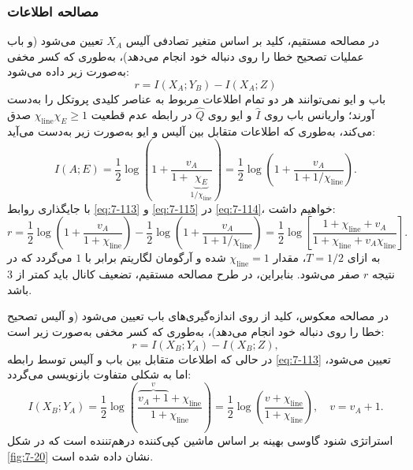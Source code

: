 \subsubsection{مصالحه اطلاعات}
\label{subsec:7-6-3}
در مصالحه مستقیم، کلید بر اساس متغیر تصادفی آلیس $X_A$ تعیین می‌شود (و باب عملیات تصحیح خطا را روی دنباله خود انجام می‌دهد)، به‌طوری که کسر مخفی به‌صورت زیر داده می‌شود:
\begin{equation}
	r = I(X_A; Y_B) - I(X_A; Z)
	\label{eq:7-114}
\end{equation}
باب و ایو نمی‌توانند هر دو تمام اطلاعات مربوط به عناصر کلیدی پروتکل را به‌دست آورند؛ واریانس باب روی $\hat{I}$ و ایو روی $\hat{Q}$ در رابطه عدم قطعیت $\chi_{\text{line}}\chi_E \geq 1$ صدق می‌کند، به‌طوری که اطلاعات متقابل بین آلیس و ایو به‌صورت زیر به‌دست می‌آید:
\begin{equation}
	I(A; E) = \frac{1}{2} \log \left( 1 + \frac{v_A}{1 + \underbrace{\chi_E}_{1/\chi_{\text{line}}}} \right) = \frac{1}{2} \log \left( 1 + \frac{v_A}{1 + 1/\chi_{\text{line}}} \right).
	\label{eq:7-115}
\end{equation}
با جایگذاری روابط \eqref{eq:7-113} و \eqref{eq:7-115} در \eqref{eq:7-114}، خواهیم داشت:
\begin{equation}
	r = \frac{1}{2} \log \left( 1 + \frac{v_A}{1 + \chi_{\text{line}}} \right) - \frac{1}{2} \log \left( 1 + \frac{v_A}{1 + 1/\chi_{\text{line}}} \right) = \frac{1}{2} \log \left[ \frac{1 + \chi_{\text{line}} + v_A}{1 + \chi_{\text{line}} + v_A \chi_{\text{line}}} \right].
	\label{eq:7-116}
\end{equation}
به ازای $T = 1/2$، مقدار $\chi_{\text{line}} = 1$ شده و آرگومان لگاریتم برابر با $1$ می‌گردد که در نتیجه $r$ صفر می‌شود. بنابراین، در طرح مصالحه مستقیم، تضعیف کانال باید کمتر از $3$  باشد.

در مصالحه معکوس، کلید از روی اندازه‌گیری‌های باب تعیین می‌شود (و آلیس تصحیح خطا را روی دنباله خود انجام می‌دهد)، به‌طوری که کسر مخفی به‌صورت زیر است:
\begin{equation}
	r = I(X_B; Y_A) - I(X_B; Z),
	\label{eq:7-117}
\end{equation}
در حالی که اطلاعات متقابل بین باب و آلیس توسط رابطه \eqref{eq:7-113} تعیین می‌شود، اما به شکلی متفاوت بازنویسی می‌گردد:
\begin{equation}
	I(X_B; Y_A) = \frac{1}{2} \log \left( \frac{\overbrace{v_A + 1}^v + \chi_{\text{line}}}{1 + \chi_{\text{line}}} \right) = \frac{1}{2} \log \left( \frac{v + \chi_{\text{line}}}{1 + \chi_{\text{line}}} \right), \quad v = v_A + 1.
	\label{eq:7-118}
\end{equation}
استراتژی شنود گاوسی بهینه بر اساس ماشین کپی‌کننده درهم‌تننده است که در شکل \ref{fig:7-20} نشان داده شده است.

